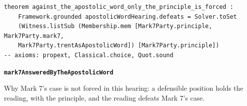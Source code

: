 \documentclass[11pt]{article}
\begin{document}
{\small\begin{verbatim}
theorem against_the_apostolic_word_only_the_principle_is_forced :
    Framework.grounded apostolicWordHearing.defeats = Solver.toSet
    (Witness.listSub (Membership.mem [Mark7Party.principle, Mark7Party.mark7,
    Mark7Party.trentAsApostolicWord]) [Mark7Party.principle])
-- axioms: propext, Classical.choice, Quot.sound
\end{verbatim}}
\par\medskip\noindent\textbf{\texttt{mark7\allowbreak{}Answered\allowbreak{}By\allowbreak{}The\allowbreak{}Apostolic\allowbreak{}Word}}\par\nobreak\noindent
Why Mark 7's case is not forced in this hearing: a defensible position holds the reading, with the principle, and the reading defeats Mark 7's case.
\end{document}
